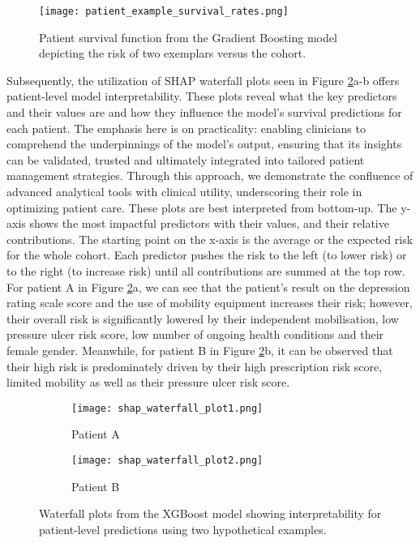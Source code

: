 \documentclass{article}
\begin{document}
\begin{figure}[h!]
    \centering
    \texttt{[image: patient\_example\_survival\_rates.png]}
    \caption{Patient survival function from the Gradient Boosting model depicting the risk of two exemplars versus the cohort.}
    \label{fig:example}
\end{figure}

Subsequently, the utilization of SHAP waterfall plots seen in Figure \ref{fig:waterfall}a-b offers patient-level model interpretability. These plots reveal what the key predictors and their values are and how they  influence the model's survival predictions for each patient. The emphasis here is on practicality: enabling clinicians to comprehend the underpinnings of the model's output, ensuring that its insights can be validated, trusted and ultimately integrated into tailored patient management strategies. Through this approach, we demonstrate the confluence of advanced analytical tools with clinical utility, underscoring their role in optimizing patient care. These plots are best interpreted from bottom-up. The y-axis shows the most impactful predictors with their values, and their relative contributions. The starting point on the x-axis is the average or the expected risk for the whole cohort. Each predictor pushes the risk to the left (to lower risk) or to the right (to increase risk) until all contributions are summed at the top row. For patient A in Figure \ref{fig:waterfall}a, we can see that the patient's result on the depression rating scale score and the use of mobility equipment increases their risk; however, their overall risk is significantly lowered by their independent mobilisation, low pressure ulcer risk score, low number of ongoing health conditions and their female gender. Meanwhile, for patient B in Figure \ref{fig:waterfall}b, it can be observed that their high risk is predominately driven by their high prescription risk score, limited mobility as well as their pressure ulcer risk score.


\begin{figure}[hbt]
    \centering
    \begin{subfigure}[b]{0.5\textwidth}
        \texttt{[image: shap\_waterfall\_plot1.png]}
        \caption{Patient A}
    \end{subfigure}%
    \begin{subfigure}[b]{0.5\textwidth}
        \texttt{[image: shap\_waterfall\_plot2.png]}
        \caption{Patient B}
    \end{subfigure}%

    \caption{Waterfall plots from the XGBoost model showing interpretability for patient-level predictions using two hypothetical examples.}
    \label{fig:waterfall}
\end{figure}
\end{document}
